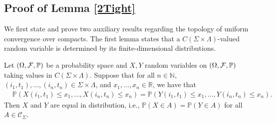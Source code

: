 \subsection{Proof of Lemma \ref{2Tight}}

We first state and prove two auxiliary results regarding the topology of uniform convergence over compacts. The first lemma states that a $C(\Sigma\times\Lambda)$-valued random variable is determined by its finite-dimensional distributions.

\begin{lemma}\label{FDD}
	Let $(\Omega,\mathcal{F},\mathbb{P})$ be a probability space and $X,Y$ random variables on $(\Omega,\mathcal{F},\mathbb{P})$ taking values in $C(\Sigma\times\Lambda)$. Suppose that for all $n\in\mathbb{N}$, $(i_1,t_1),\dots,(i_n,t_n)\in\Sigma\times\Lambda$, and $x_1,\dots,x_n\in\mathbb{R}$, we have that
	\begin{align*}
	&\mathbb{P}\left(X(i_1,t_1)\leq x_1,\dots,X(i_n,t_n)\leq x_n\right) = \mathbb{P}\left(Y(i_1,t_1)\leq x_1,\dots,Y(i_n,t_n)\leq x_n\right).
	\end{align*}
	Then $X$ and $Y$ are equal in distribution, i.e., $\mathbb{P}(X\in A) = \mathbb{P}(Y\in A)$ for all $A\in\mathcal{C}_\Sigma$.
	
\end{lemma}

